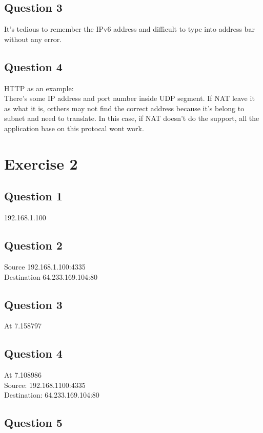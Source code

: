 \documentclass{article}
\begin{document}
\subsection{Question 3}

It's tedious to remember the IPv6 address and difficult to type into address bar without 
any error.

\subsection{Question 4}

HTTP as an example: \\
There's some IP address and port number inside UDP segment. If NAT leave it as what it is,
orthers may not find the correct address because it's belong to subnet and need to translate.
In this case, if NAT doesn't do the support, all the application base on this protocal wont
work.

\section{Exercise 2}

\subsection{Question 1}

192.168.1.100

\subsection{Question 2}

Source 192.168.1.100:4335\\
Destination  64.233.169.104:80

\subsection{Question 3}

At 7.158797

\subsection{Question 4}

At 7.108986\\
Source: 192.168.1100:4335\\
Destination: 64.233.169.104:80\\

\subsection{Question 5}
\end{document}
